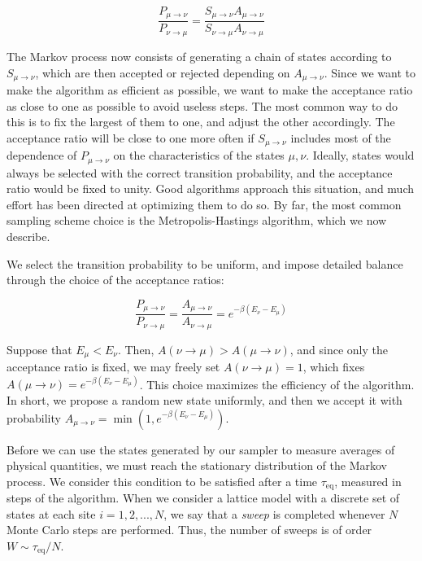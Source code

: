 \begin{equation}
\frac{P_{\mu\rightarrow\nu}}{P_{\nu\rightarrow\mu}}= \frac{S_{ \mu\rightarrow\nu} A_{\mu\rightarrow\nu}}{S_{ \nu\rightarrow\mu} A_{\nu\rightarrow\mu}}
\end{equation}

The Markov process now consists of generating a chain of states according to $S_{ \mu\rightarrow\nu}$, which are then accepted or rejected depending on $A_{\mu\rightarrow\nu}$.
Since we want to make the algorithm as efficient as possible, we want to make the acceptance ratio as close to one as possible to avoid useless steps.	
The most common way to do this is to fix the largest of them to one, and adjust the other accordingly.
The acceptance ratio will be close to one more often if $S_{ \mu\rightarrow\nu}$ includes most of the dependence of $P_{\mu\rightarrow\nu}$ on the characteristics of the states $\mu, \nu$.
Ideally, states would always be selected with the correct transition probability, and the acceptance ratio would be fixed to unity.
Good algorithms approach this situation, and much effort has been directed at optimizing them to do so.
By far, the most common sampling scheme choice is the Metropolis-Hastings algorithm, which we now  describe.

We select the transition probability to be uniform, and impose detailed balance through the choice of the acceptance ratios:

\begin{equation}
\frac{ P_{\mu\rightarrow\nu }}{ P_{\nu\rightarrow\mu }} = \frac{ A_{\mu\rightarrow\nu }}{ A_{\nu\rightarrow\mu } } = e^{-\beta ( E_\nu - E_\mu )}
\end{equation}

Suppose that $E_\mu < E_\nu $.
Then, $A ( \nu \rightarrow \mu ) > A ( \mu \rightarrow \nu ) $, and since only the acceptance ratio is fixed, we may freely set $A ( \nu \rightarrow \mu ) = 1$, which fixes $A ( \mu \rightarrow \nu ) = e^{-\beta ( E_\nu - E_\mu ) }$.
This choice maximizes the efficiency of the algorithm.
In short, we propose a random new state uniformly, and then we accept it with probability $A_{\mu\rightarrow \nu} = \min (1,  e^{-\beta ( E_\nu - E_\mu )})$.

Before we can use the states generated by our sampler to measure averages of physical quantities, we must reach the stationary distribution of the Markov process.
We consider this condition to be satisfied after a time $\tau_{\text{eq}}$, measured in steps of the algorithm.
When we consider a lattice model with a discrete set of states at each site $i = 1, 2, ..., N$, we say that a \emph{sweep} is completed whenever $N$ Monte Carlo steps are performed.
Thus, the number of  sweeps is of order $W \sim \tau_{\text{eq}} / N$.

